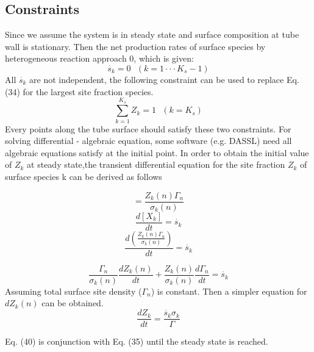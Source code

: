 \documentclass[11pt]{article}
\begin{document}
\subsection{Constraints}
Since we assume the system is in steady state and surface composition at tube wall is stationary. Then the net production rates of surface species by heterogeneous reaction approach 0, which is given:
\begin{equation}
   \boxed{ \dot{s_k} = 0~~~(k = 1\cdot\cdot\cdot K_s-1)}
\end{equation}
All $\dot{s_k}$ are not independent, the following constraint can be used to replace Eq. (34) for the largest site fraction species.
\begin{equation}
   \boxed{ \sum_{k=1}^{K_s}Z_k = 1~~~(k = K_s)}
\end{equation}
Every points along the tube surface should satisfy these two constraints.
For solving differential - algebraic equation, some software (e.g. DASSL) need all algebraic equations satisfy at the initial point. In order to obtain the initial value of $Z_k$ at steady state,the transient differential equation for the site fraction $Z_k$ of surface species k can be derived as follows\cite{bird2002transport}

\begin{equation}
    [X_k] = \frac{Z_k(n)\Gamma_n}{\sigma_k(n)} 
\end{equation}
\begin{equation}
    \frac{d[X_k]}{dt} = \dot{s_k}
\end{equation}
\begin{equation}
\frac{d(\frac{Z_k(n)\Gamma_n}{\sigma_k (n)})}{dt}= \dot{s_k}
\end{equation}

\begin{equation}
    \frac{\Gamma_n}{\sigma_k(n)}\frac{dZ_k(n)}{dt} + \frac{Z_k(n)}{\sigma_k(n)}\frac{d\Gamma_n}{dt} = \dot{s_k}
\end{equation}
Assuming total surface site density ($\Gamma_n$) is constant. Then a simpler equation for $dZ_k(n)$ can be obtained.
\begin{equation}
    \frac{dZ_k}{dt} = \frac{\dot{s_k}\sigma_k}{\Gamma}
\end{equation}

Eq. (40) is conjunction with Eq. (35) until the steady state is reached.
\end{document}
